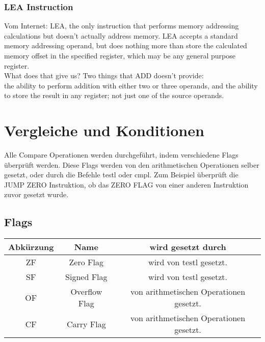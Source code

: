 \documentclass[a4paper, 11pt]{article}
\begin{document}
\subsubsection{LEA Instruction}
Vom Internet: LEA, the only instruction that performs memory addressing calculations but doesn't actually address memory. LEA accepts a standard memory addressing operand, but does nothing more than store the calculated memory offset in the specified register, which may be any general purpose register.\\
What does that give us? Two things that ADD doesn't provide:\\
the ability to perform addition with either two or three operands, and
the ability to store the result in any register; not just one of the source operands.

\section{Vergleiche und Konditionen}
Alle Compare Operationen werden durchgeführt, indem verschiedene Flags überprüft werden. Diese Flags werden von den arithmetischen Operationen selber gesetzt, oder durch die Befehle testl oder cmpl. Zum Beispiel überprüft die JUMP ZERO Instruktion, ob das ZERO FLAG von einer anderen Instruktion zuvor gesetzt wurde.

\subsection{Flags}
\begin{tabular}{|c|c|c|}
	\hline
	Abkürzung & Name & wird gesetzt durch \\\hline 
	ZF & Zero Flag & wird von testl gesetzt.\\\hline
	SF & Signed Flag & wird von testl gesetzt.\\\hline
	OF & Overflow Flag & von arithmetischen Operationen gesetzt.\\\hline
	CF & Carry Flag & von arithmetischen Operationen gesetzt.\\\hline
\end{tabular}
\end{document}
